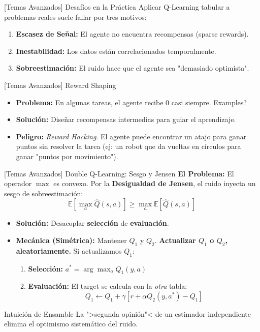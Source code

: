 \documentclass[xcolor=dvipsnames, handout]{beamer}
\begin{document}
\begin{frame}{[Temas Avanzados] Desaf\'ios en la Pr\'actica}
Aplicar Q-Learning tabular a problemas reales suele fallar por tres motivos:
\begin{enumerate}
    \item \textbf{Escasez de Se\~nal:} El agente no encuentra recompensas (sparse rewards).
    \item \textbf{Inestabilidad:} Los datos est\'an correlacionados temporalmente.
    \item \textbf{Sobreestimaci\'on:} El ruido hace que el agente sea "demasiado optimista".
\end{enumerate}

\end{frame}

\begin{frame}{[Temas Avanzados] Reward Shaping}
\begin{itemize}
    \item \textbf{Problema:} En algunas tareas, el agente recibe $0$ casi siempre. \textquestiondown Examples?
    \item<2-> \textbf{Soluci\'on:} Dise\~nar recompensas intermedias para guiar el aprendizaje.
    \item<3-> \textbf{Peligro:} \textit{Reward Hacking}. El agente puede encontrar un atajo para ganar puntos sin resolver la tarea (ej: un robot que da vueltas en c\'irculos para ganar "puntos por movimiento").
\end{itemize}
\end{frame}

\begin{frame}{[Temas Avanzados] Double Q-Learning: Sesgo y Jensen}
\textbf{El Problema:} El operador $\max$ es convexo. Por la \textbf{Desigualdad de Jensen}, el ruido inyecta un sesgo de sobreestimaci\'on:
\[ \mathbb{E}[\max_{a} \hat{Q}(s, a)] \geq \max_{a} \mathbb{E}[\hat{Q}(s, a)] \]

\begin{itemize}
    \item \textbf{Soluci\'on:} Desacoplar \textbf{selecci\'on} de \textbf{evaluaci\'on}.
    \item \textbf{Mec\'anica (Sim\'etrica):} Mantener $Q_1$ y $Q_2$. \textbf{Actualizar $Q_1$ o $Q_2$, aleatoriamente.} Si actualizamos $Q_1$:
    \begin{enumerate}
        \item \textbf{Selecci\'on:} $a^* = \arg\max_{a} Q_1(y, a)$ 
        \item \textbf{Evaluaci\'on:} El target se calcula con la \textit{otra} tabla:
        \[ Q_1 \leftarrow Q_1 + \gamma [ r + \alpha Q_2(y, a^*) - Q_1 ] \]
    \end{enumerate}
\end{itemize}

\begin{exampleblock}{Intuici\'on de Ensamble}
    La ">segunda opini\'on"< de un estimador independiente elimina el optimismo sistem\'atico del ruido.
\end{exampleblock}
\end{frame}
\end{document}
